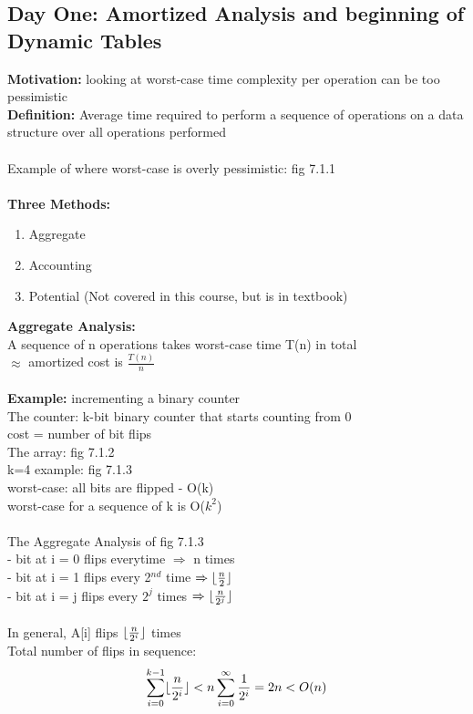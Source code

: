 \documentclass{article}
\DeclarePairedDelimiter\floor{\lfloor}{\rfloor}
\begin{document}
	\subsection{Day One: Amortized Analysis and beginning of Dynamic Tables}
	\textbf{Motivation:} looking at worst-case time complexity per operation can be too pessimistic\\
	\textbf{Definition:} Average time required to perform a sequence of operations on a data structure over all operations performed\\\\
	Example of where worst-case is overly pessimistic: fig 7.1.1\\\\
	\textbf{Three Methods:}\begin{enumerate}
		\item Aggregate
		\item Accounting
		\item Potential (Not covered in this course, but is in textbook)
	\end{enumerate}
	\textbf{Aggregate Analysis:\\}
	A sequence of n operations takes worst-case time T(n) in total\\
	$\approx$ amortized cost is $\frac{T(n)}{n}$\\\\
	\textbf{Example:} incrementing a binary counter\\
	The counter: k-bit binary counter that starts counting from 0\\
	cost = number of bit flips\\
	The array: fig 7.1.2\\
	k=4 example: fig 7.1.3\\
	worst-case: all bits are flipped - O(k)\\
	worst-case for a sequence of k is O($k^2$)\\\\
	The Aggregate Analysis of fig 7.1.3\\
	- bit at i = 0 flips everytime $\Rightarrow$ n times\\
	- bit at i = 1 flips every 2$^{nd}$ time $\Rightarrow \floor{\frac{n}{2}}$\\
	- bit at i = j flips every $2^j$ times $\Rightarrow \floor{\frac{n}{2^j}}$\\\\
	In general, A[i] flips $\floor{\frac{n}{2^i}}$ times\\
	Total number of flips in sequence: $$\sum_{i=0}^{k-1}\floor{\frac{n}{2^i}} < n\sum_{i=0}^{\infty}\frac{1}{2^i} = 2n < O(n)$$
\end{document}
